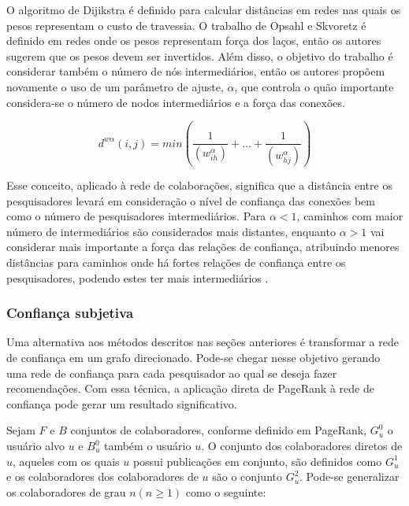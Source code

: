 \documentclass[12pt]{article}
\begin{document}
O algoritmo de Dijikstra \cite{dijkstra1959note} é definido para calcular distâncias em redes nas quais os pesos representam o 
custo de travessia. O trabalho de Opsahl e Skvoretz \cite{opsahl2010node} é definido em redes onde os pesos representam força 
dos laços, então os autores sugerem que os pesos devem ser invertidos. Além disso, o objetivo do trabalho é considerar também 
o número de nós intermediários, então os autores propõem novamente o uso de um parâmetro de ajuste, $\alpha$, que controla o quão 
importante considera-se o número de nodos intermediários e a força das conexões.

\begin{equation} \label{eqn:distance}
  d^{w\alpha}(i, j) = min \left( \frac{1}{ \left( w_{ih}^{\alpha} \right) } + \dots + \frac{1}{ \left( w_{hj}^{\alpha} \right) }  \right) 
\end{equation}

Esse conceito, aplicado à rede de colaborações, significa que a distância entre os pesquisadores levará em consideração o nível 
de confiança das conexões bem como o número de pesquisadores intermediários. Para $\alpha < 1$, caminhos com maior número de 
intermediários são considerados mais distantes, enquanto $\alpha > 1$ vai considerar mais importante a força das relações de 
confiança, atribuindo menores distâncias para caminhos onde há fortes relações de confiança entre os pesquisadores, podendo estes 
ter mais intermediários \cite{opsahl2010node}.

\subsubsection{Confiança subjetiva}

Uma alternativa aos métodos descritos nas seções anteriores é transformar a rede de confiança em um grafo direcionado. Pode-se chegar nesse objetivo gerando uma rede de confiança para cada pesquisador ao qual se deseja fazer recomendações. Com essa técnica, a aplicação direta de PageRank à rede de confiança pode gerar um resultado significativo.

Sejam $F$ e $B$ conjuntos de colaboradores, conforme definido em PageRank, $G_{u}^{0}$ o usuário alvo $u$ e $B_{u}^{0}$ também o 
usuário $u$. O conjunto dos colaboradores diretos de $u$, aqueles com os quais $u$ possui publicações em conjunto, são definidos 
como $G_{u}^{1}$ e os colaboradores dos colaboradores de $u$ são o conjunto $G_{u}^{2}$. Pode-se generalizar os colaboradores 
de grau $n (n \geq 1)$ como o seguinte:
\end{document}
